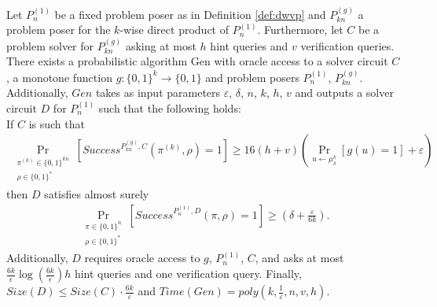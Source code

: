 \begin{theorem}
\label{th:sec_amp_for_dwvp}
Let $P_{n}^{(1)}$ be a fixed problem poser as in Definition \ref{def:dwvp}
and $P_{kn}^{(g)}$ a problem poser for the $k$-wise direct product of $P_{n}^{(1)}$.
Furthermore, let $C$ be a problem solver for $P_{kn}^{(g)}$ asking at most $h$ hint queries and $v$ verification queries.
There exists a probabilistic algorithm Gen with oracle access to a solver circuit $C$,
a monotone function $g:\{0,1\}^k \rightarrow \{0,1\}$ and problem posers $P_{n}^{(1)}$, $P_{kn}^{(g)}$.
Additionally, $\mathit{Gen}$ takes as input parameters $\varepsilon$, $\delta$, $n$, $k$, $h$, $v$ and outputs a solver circuit $D$ for $P_{n}^{(1)}$
such that the following holds: \\
If $C$ is such that
  \begin{align*}
    \underset{\substack{\pi^{(k)} \in \{0,1\}^{kn} \\ \rho \in \{0,1\}^{*}}}{\Pr}\left[\mathit{Success}^{P_{kn}^{(g)}, C}(\pi^{(k)}, \rho) = 1\right]
    \geq 16(h+v)\left(\underset{u \leftarrow \mu_\delta^k}{\Pr}\left[g(u) = 1\right] + \varepsilon\right)
  \end{align*}
then $D$ satisfies almost surely
  \begin{align*}
    \underset{\substack{\pi \in \{0,1\}^{n} \\ \rho \in \{0,1\}^{*}}}
    {\Pr}\left[\mathit{Success}^{P_{n}^{(1)},D}(\pi, \rho) = 1\right] \geq (\delta + \frac{\varepsilon}{6k}).
  \end{align*}
Additionally, $D$ requires oracle access to $g$, $P_{n}^{(1)}$, $C$,
and asks at most $\frac{6k}{\epsilon}\log\left(\frac{6k}{\epsilon}\right) h$ hint queries and one verification query.
Finally, $\mathit{Size}(D) \leq \mathit{Size}(C) \cdot \frac{6k}{\varepsilon}$ and $\mathit{Time}(\mathit{Gen}) = \mathit{poly}(k, \frac{1}{\varepsilon}, n, v, h)$.
\end{theorem}
%


